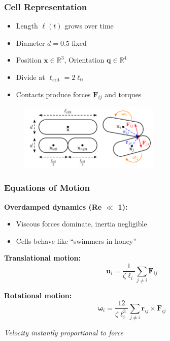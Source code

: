 \documentclass[10pt,t]{beamer}
\begin{document}
\begin{frame}
    \frametitle{Cell Representation}

    \begin{itemize}
        \item Length $\ell(t)$ grows over time
        \item Diameter $d = 0.5$ fixed
        \item Position $\mathbf{x} \in \mathbb{R}^3$, Orientation $\mathbf{q} \in \mathbb{R}^4$
        \item Divide at $\ell_\text{crit} = 2 \ell_0$
        \item Contacts produce forces $\mathbf{F}_{ij}$ and torques
    \end{itemize}

    \vspace{.7cm}

    \begin{center}
        \begin{figure}
            \centering
            \includegraphics[width=0.6\textwidth]{figures/spherocylinder_model.png}
        \end{figure}
    \end{center}

\end{frame}

\begin{frame}
    \frametitle{Equations of Motion}

    \textbf{Overdamped dynamics (Re $\ll$ 1):}
    \begin{itemize}
        \item Viscous forces dominate, inertia negligible
        \item Cells behave like ``swimmers in honey''
    \end{itemize}

    \textbf{Translational motion:}
    \begin{equation*}
        \mathbf{u}_i = \frac{1}{\zeta \ell_i} \sum_{j \neq i} \mathbf{F}_{ij}
    \end{equation*}

    \textbf{Rotational motion:}
    \begin{equation*}
        \boldsymbol{\omega}_i = \frac{12}{\zeta \ell_i^3} \sum_{j \neq i} \mathbf{r}_{ij} \times \mathbf{F}_{ij}
    \end{equation*}

    \vspace{0.5cm}

    \begin{center}
        \textit{Velocity instantly proportional to force}
    \end{center}

\end{frame}
\end{document}
